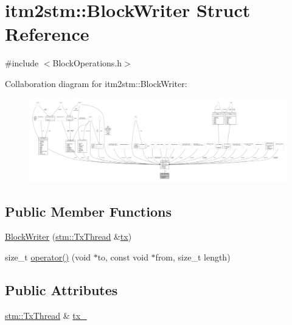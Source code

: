 \hypertarget{structitm2stm_1_1BlockWriter}{\section{itm2stm\-:\-:Block\-Writer Struct Reference}
\label{structitm2stm_1_1BlockWriter}
}


{\ttfamily \#include $<$Block\-Operations.\-h$>$}



Collaboration diagram for itm2stm\-:\-:Block\-Writer\-:
\nopagebreak
\begin{figure}[H]
\begin{center}
\leavevmode
\includegraphics[width=350pt]{structitm2stm_1_1BlockWriter__coll__graph}
\end{center}
\end{figure}
\subsection*{Public Member Functions}
\begin{DoxyCompactItemize}
\item 
\hyperlink{structitm2stm_1_1BlockWriter_a4a3690b86ade5fc2d9d7112fdc7b6eb6}{Block\-Writer} (\hyperlink{structstm_1_1TxThread}{stm\-::\-Tx\-Thread} \&\hyperlink{stmskip_8cc_a0f1c58699b83ce5a08bd9ee859250d72}{tx})
\item 
size\-\_\-t \hyperlink{structitm2stm_1_1BlockWriter_a0319dc33fb20ef4b25814997264e9248}{operator()} (void $\ast$to, const void $\ast$from, size\-\_\-t length)
\end{DoxyCompactItemize}
\subsection*{Public Attributes}
\begin{DoxyCompactItemize}
\item 
\hyperlink{structstm_1_1TxThread}{stm\-::\-Tx\-Thread} \& \hyperlink{structitm2stm_1_1BlockWriter_a0a263b48c04d16925c3ba13b21e47735}{tx\-\_\-}
\end{DoxyCompactItemize}


